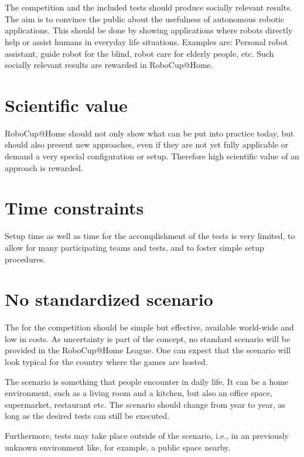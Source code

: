\section{}
\label{concept:social_relevance}
The competition and the included tests should produce socially relevant results. The aim is to convince the public about the usefulness of autonomous robotic applications. This should be done by showing applications where robots directly help or assist humans in everyday life situations. Examples are: Personal robot assistant, guide robot for the blind, robot care for elderly people, etc. Such socially relevant results are rewarded in RoboCup@Home.

\section{Scientific value}
\label{concept:scientific_value}
RoboCup@Home should not only show what can be put into practice today, but should also present new approaches, even if they are not yet fully applicable or demand a very special configuration or setup. Therefore high scientific value of an approach is rewarded.

\section{Time constraints}
\label{concept:time_constraints}
Setup time as well as time for the accomplishment of the tests is very limited, to allow for many participating teams and tests, and to foster simple setup procedures.

\section{No standardized scenario}
\label{concept:no_standardized_scenario}
The  for the competition should be simple but effective, available world-wide and low in costs. As uncertainty is part of the concept, no standard scenario will be provided in the RoboCup@Home League. One can expect that the scenario will look typical for the country where the games are hosted.

The scenario is something that people encounter in daily life. It can be a home environment, such as a living room and a kitchen, but also an office space, supermarket, restaurant etc. The scenario should change from year to year, as long as the desired tests can still be executed.

Furthermore, tests may take place outside of the scenario, i.e., in an previously unknown environment like, for example, a public space nearby.

